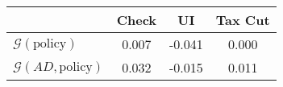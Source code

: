 \begin{tabular}{@{}lccc@{}}
\toprule
                          & Check      & UI    & Tax Cut    \\  \midrule
$\mathcal{G}(\text{policy})$ & 0.007  & -0.041  & 0.000     \\
$\mathcal{G}(AD,\text{policy})$ & 0.032  & -0.015  & 0.011     \\
\end{tabular}
